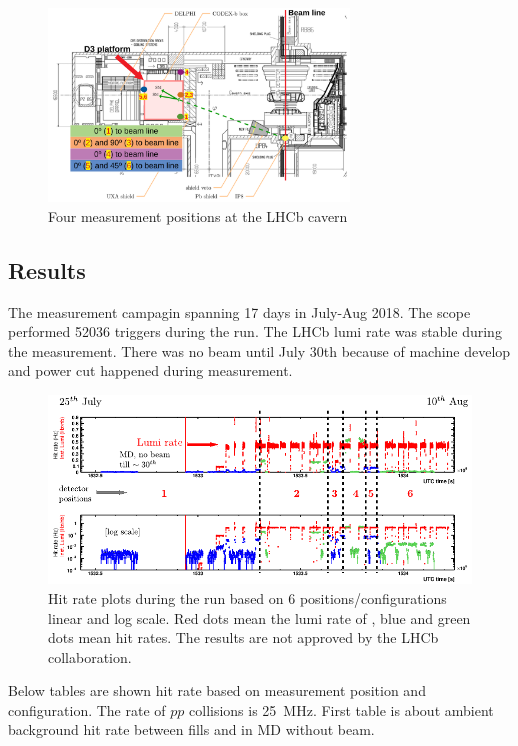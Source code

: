 \begin{figure}[h]
\centering
    \includegraphics[width=8cm]{figs/INT/configuration.pdf}
\caption{
    Four measurement positions at the LHCb cavern
}
\end{figure}

\subsection{Results}

The measurement campagin spanning 17 days in July-Aug 2018.
The scope performed 52036 triggers during the run.
The LHCb lumi rate was stable during the measurement.
There was no beam until July 30th because of machine develop and power cut happened during measurement.

\vspace{0.2cm}
\begin{figure}[h]
\centering
    \includegraphics[width=12cm]{figs/INT/codexb_data_global.pdf}
\caption{
    Hit rate plots during the run based on 6 positions/configurations linear and log scale. Red dots mean the lumi rate of \lhcb, blue and green dots mean hit rates. The results are not approved by the LHCb collaboration.
}
\end{figure}

Below tables are shown hit rate based on measurement position and configuration.
The rate of $pp$ collisions is 25~MHz.
First table is about ambient background hit rate between fills and in MD without beam.

